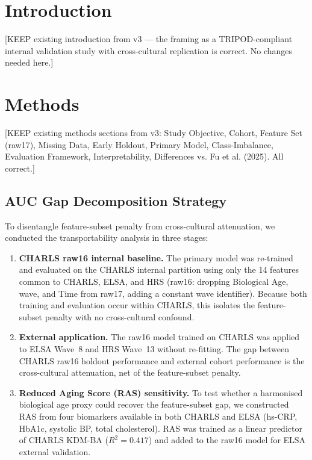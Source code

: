 \documentclass[11pt,a4paper]{article}
\begin{document}
\section{Introduction}
[KEEP existing introduction from v3 — the framing as a TRIPOD-compliant internal
validation study with cross-cultural replication is correct. No changes needed here.]

\section{Methods}

[KEEP existing methods sections from v3: Study Objective, Cohort, Feature Set (raw17),
Missing Data, Early Holdout, Primary Model, Class-Imbalance, Evaluation Framework,
Interpretability, Differences vs. Fu et al. (2025). All correct.]

\subsection{AUC Gap Decomposition Strategy}
To disentangle feature-subset penalty from cross-cultural attenuation, we conducted
the transportability analysis in three stages:

\begin{enumerate}
  \item \textbf{CHARLS raw16 internal baseline.} The primary model was re-trained and
        evaluated on the CHARLS internal partition using only the 14 features common to
        CHARLS, ELSA, and HRS (raw16: dropping Biological Age, wave, and Time from
        raw17, adding a constant wave identifier). Because both training and evaluation
        occur within CHARLS, this isolates the feature-subset penalty with no
        cross-cultural confound.

  \item \textbf{External application.} The raw16 model trained on CHARLS was applied to
        ELSA Wave~8 and HRS Wave~13 without re-fitting. The gap between CHARLS raw16
        holdout performance and external cohort performance is the cross-cultural
        attenuation, net of the feature-subset penalty.

  \item \textbf{Reduced Aging Score (RAS) sensitivity.} To test whether a harmonised
        biological age proxy could recover the feature-subset gap, we constructed RAS
        from four biomarkers available in both CHARLS and ELSA (hs-CRP, HbA1c, systolic
        BP, total cholesterol). RAS was trained as a linear predictor of CHARLS KDM-BA
        ($R^2=0.417$) and added to the raw16 model for ELSA external validation.
\end{enumerate}
\end{document}
